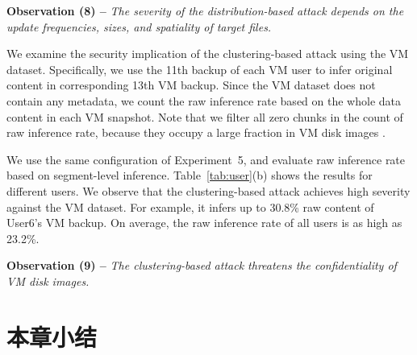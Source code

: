 {\bf Observation (8) --} {\em The severity of the distribution-based attack depends on the update frequencies, sizes, and spatiality of target files. } 

We examine the security implication of the clustering-based attack using the VM dataset. Specifically, we use the 11th  backup of each VM user  to infer original content in corresponding 13th VM backup. Since the VM dataset does not contain any metadata, we count the raw inference rate based on the  whole data content in each VM snapshot. Note that we filter all zero chunks in the count of raw inference rate, because they occupy a large fraction in VM disk images \cite{jin09}.           

We use the same configuration of Experiment~5, and evaluate raw inference rate
based on segment-level inference.  Table~\ref{tab:user}(b) shows the results
for different users.  We observe that the clustering-based attack achieves high
severity against the VM dataset. For example, it infers up to 30.8\% raw
content of User6's VM backup. On average, the raw inference rate of all users
is as high as 23.2\%.  

{\bf Observation (9) --} {\em The clustering-based attack threatens the
confidentiality of VM disk images. } 

\section{本章小结}


